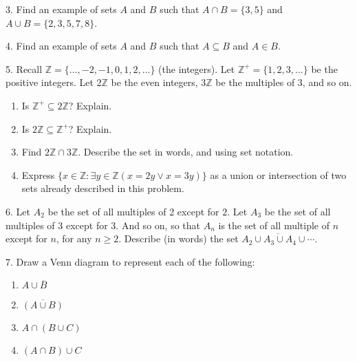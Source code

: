 \documentclass[10pt,]{book}
\theoremstyle{plain}
\theoremstyle{definition}
\numberwithin{equation}{chapter}
\def\Z{\mathbb Z}
\def\st{:}
\renewcommand{\bar}{\overline}
\begin{document}
\begin{exerciselist}
\item[3.]\hypertarget{exercise-13}{}
          Find an example of sets \(A\) and \(B\) such that \(A\cap B = \{3, 5\}\) and \(A \cup B = \{2, 3, 5, 7, 8\}\).
\par\smallskip
\item[4.]\hypertarget{exercise-14}{}
          Find an example of sets \(A\) and \(B\) such that \(A \subseteq B\) and \(A \in B\).
\par\smallskip
\item[5.]\hypertarget{exercise-15}{}
          Recall \(\Z = \{\ldots,-2,-1,0, 1,2,\ldots\}\) (the integers). Let \(\Z^+ = \{1, 2, 3, \ldots\}\) be the positive integers. Let \(2\Z\) be the even integers, \(3\Z\) be the multiples of 3, and so on.
\leavevmode%
\begin{enumerate}[label=(\alph*)]
\item\hypertarget{li-101}{} Is \(\Z^+ \subseteq 2\Z\)? Explain. %
\item\hypertarget{li-102}{} Is \(2\Z \subseteq \Z^+\)? Explain. %
\item\hypertarget{li-103}{} Find \(2\Z \cap 3\Z\). Describe the set in words, and using set notation. %
\item\hypertarget{li-104}{} Express \(\{x \in \Z \st \exists y\in \Z (x = 2y \vee x = 3y)\}\) as a union or intersection of two sets already described in this problem. %
\end{enumerate}
\par\smallskip
\item[6.]\hypertarget{exercise-16}{}
          Let \(A_2\) be the set of all multiples of 2 except for \(2\). Let \(A_3\) be the set of all multiples of 3 except for 3. And so on, so that \(A_n\) is the set of all multiple of \(n\) except for \(n\), for any \(n \ge 2\). Describe (in words) the set \(\bar{A_2 \cup A_3 \cup A_4 \cup \cdots}\).
\par\smallskip
\item[7.]\hypertarget{exercise-17}{}
          Draw a Venn diagram to represent each of the following:
\leavevmode%
\begin{enumerate}[label=(\alph*)]
\item\hypertarget{li-109}{}\(A \cup \bar B\)%
\item\hypertarget{li-110}{}\(\bar{(A \cup B)}\)%
\item\hypertarget{li-111}{}\(A \cap (B \cup C)\)%
\item\hypertarget{li-112}{}\((A \cap B) \cup C\)%

\end{enumerate}
\end{exerciselist}
\end{document}
